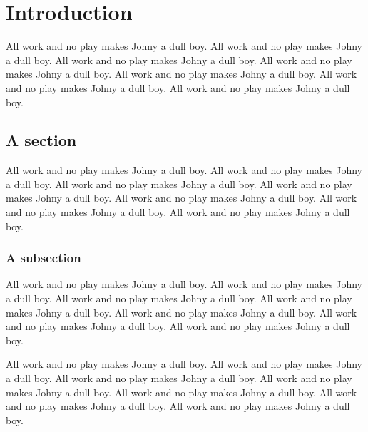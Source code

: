 \documentclass[12pt]{orstthesis}
\begin{document}
\frontmatter
\flyleaf
{}
\copyrightpage
\osutitle
\approval
{}
\tableofcontents
\newpage
\listoffigures
\newpage
\listoftables
\newpage
\mainmatters
\doublespacing
\chapter{Introduction}
All work and no play makes Johny a dull boy.
All work and no play makes Johny a dull boy.
All work and no play makes Johny a dull boy.
All work and no play makes Johny a dull boy.
All work and no play makes Johny a dull boy.
All work and no play makes Johny a dull boy.
All work and no play makes Johny a dull boy.
\section{A section}
All work and no play makes Johny a dull boy.
All work and no play makes Johny a dull boy.
All work and no play makes Johny a dull boy.
All work and no play makes Johny a dull boy.
All work and no play makes Johny a dull boy.
All work and no play makes Johny a dull boy.
All work and no play makes Johny a dull boy.
\subsection{A subsection}
All work and no play makes Johny a dull boy.
All work and no play makes Johny a dull boy.
All work and no play makes Johny a dull boy.
All work and no play makes Johny a dull boy.
All work and no play makes Johny a dull boy.
All work and no play makes Johny a dull boy.
All work and no play makes Johny a dull boy.
\begin{table}
\caption[
All work and no play makes Johny a dull boy.
]{
All work and no play makes Johny a dull boy.
All work and no play makes Johny a dull boy.
All work and no play makes Johny a dull boy.
All work and no play makes Johny a dull boy.
All work and no play makes Johny a dull boy.
All work and no play makes Johny a dull boy.
All work and no play makes Johny a dull boy.
}
\end{table}
\end{document}
